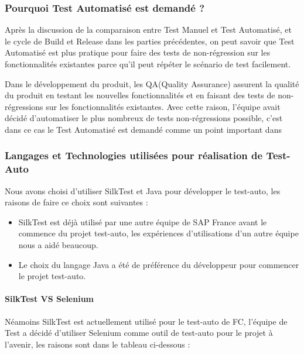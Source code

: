 	\subsubsection{Pourquoi Test Automatisé est demandé ?}
	Après la discussion de la comparaison entre Test Manuel et Test Automatisé, et le cycle de Build et Release dans les parties précédentes, on peut savoir que Test Automatisé est plus pratique pour faire des tests de non-régression sur les fonctionnalités existantes parce qu'il peut répéter le scénario de test facilement.
	
	\par Dans le développement du produit, les QA(Quality Assurance) assurent la qualité du produit en testant les nouvelles fonctionnalités et en faisant des tests de non-régressions sur les fonctionnalités existantes. Avec cette raison, l'équipe avait décidé d'automatiser le plus nombreux de tests non-régressions possible, c'est dans ce cas le Test Automatisé est demandé comme un point important dans 

\subsubsection{Langages et Technologies utilisées pour réalisation de Test-Auto}
    Nous avons choisi d'utiliser SilkTest et Java pour développer le test-auto, les raisons de faire ce choix sont suivantes : 
    \begin{itemize}
        \item SilkTest est déjà utilisé par une autre équipe de SAP France avant le commence du projet test-auto, les expériences d'utilisations d'un autre équipe nous a aidé beaucoup.
        \item Le choix du langage Java a été de préférence du développeur pour commencer le projet test-auto.
    \end{itemize}
    
    \paragraph{SilkTest VS Selenium}
    Néamoins SilkTest est actuellement utilisé pour le test-auto de FC, l'équipe de Test a décidé d'utiliser Selenium comme outil de test-auto pour le projet à l'avenir, les raisons sont dans le tableau ci-dessous : 
    
